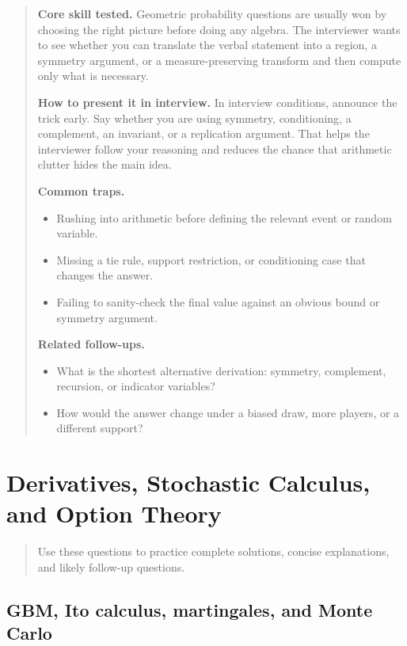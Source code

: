 \documentclass[11pt,letterpaper,openany]{book}
\newcommand{\ChapterIntro}[1]{%
  \begin{quote}\small #1\end{quote}%
}
\newenvironment{EditorialNote}
  {\begin{quote}\small\setlength{\parskip}{0.25em}}
  {\end{quote}}
\newcommand{\QuestionSpacer}{\vspace{0.4em}}
\begin{document}
\begin{EditorialNote}


\textbf{Core skill tested.} Geometric probability questions are usually won by choosing the right picture before doing any algebra. The interviewer wants to see whether you can translate the verbal statement into a region, a symmetry argument, or a measure-preserving transform and then compute only what is necessary.

\textbf{How to present it in interview.} In interview conditions, announce the trick early. Say whether you are using symmetry, conditioning, a complement, an invariant, or a replication argument. That helps the interviewer follow your reasoning and reduces the chance that arithmetic clutter hides the main idea.

\textbf{Common traps.}
\begin{itemize}
\item Rushing into arithmetic before defining the relevant event or random variable.
\item Missing a tie rule, support restriction, or conditioning case that changes the answer.
\item Failing to sanity-check the final value against an obvious bound or symmetry argument.
\end{itemize}

\textbf{Related follow-ups.}
\begin{itemize}
\item What is the shortest alternative derivation: symmetry, complement, recursion, or indicator variables?
\item How would the answer change under a biased draw, more players, or a different support?
\end{itemize}


\end{EditorialNote}
\QuestionSpacer

\section{Derivatives, Stochastic Calculus, and Option Theory}
\ChapterIntro{Use these questions to practice complete solutions, concise explanations, and likely follow-up questions.}

\subsection{GBM, Ito calculus, martingales, and Monte Carlo}
\end{document}
